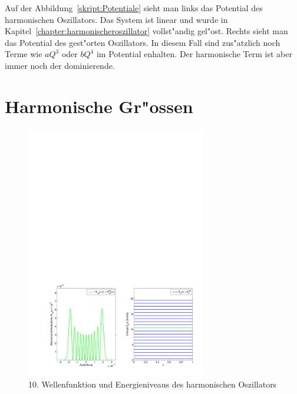 \begin{refsection}
Auf der Abbildung~\ref{skript:Potentiale} sieht man links das Potential des harmonischen Oszillators. Das System ist linear und wurde in Kapitel~\ref{chapter:harmonischeroszillator} vollst"andig gel"ost. Rechts sieht man das Potential des gest"orten Oszillators. In diesem Fall sind zus"atzlich noch Terme wie $aQ^3$ oder $bQ^4$ im Potential enhalten. Der harmonische Term ist aber immer noch der dominierende.

\section{Harmonische Gr"ossen}

\begin{figure}[h]	%
\centering
\includegraphics[width=0.7\textwidth]{anharmonisch/images/Harmonisch.pdf}
\caption{10. Wellenfunktion und Energieniveaus des harmonischen Oszillators
\label{skript:Harmonisch}}
\end{figure}


\end{refsection}
